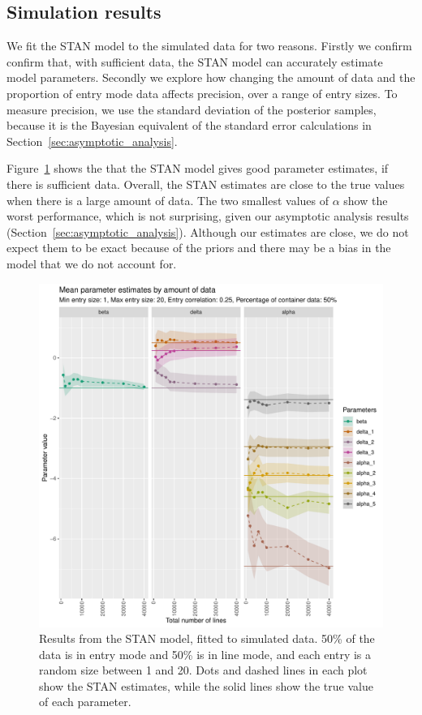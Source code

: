 \documentclass{article}
\begin{document}
\subsection{Simulation results}
We fit the STAN model to the simulated data for two reasons. Firstly we confirm confirm that, with sufficient data, the STAN model can accurately estimate model parameters. Secondly we explore how changing the amount of data and the proportion of entry mode data affects precision, over a range of entry sizes. To measure precision, we use the standard deviation of the posterior samples, because it is the Bayesian equivalent of the standard error calculations in Section~\ref{sec:asymptotic_analysis}.

Figure~\ref{fig:simulation_estimation} shows the that the STAN model gives good parameter estimates, if there is sufficient data. Overall, the STAN estimates are close to the true values when there is a large amount of data. The two smallest values of \(\alpha\) show the worst performance, which is not surprising, given our asymptotic analysis results (Section~\ref{sec:asymptotic_analysis}). Although our estimates are close, we do not expect them to be exact because of the priors and there may be a bias in the model that we do not account for. 

\begin{figure}[h!]
\includegraphics[width=\textwidth]{../visualisations/figures/simulation_estimates_random_effect.pdf}
\caption{Results from the STAN model, fitted to simulated data. 50\% of the data is in entry mode and 50\% is in line mode, and each entry is a random size between 1 and 20. Dots and dashed lines in each plot show the STAN estimates, while the solid lines show the true value of each parameter.}
\label{fig:simulation_estimation}
\end{figure}
\end{document}
